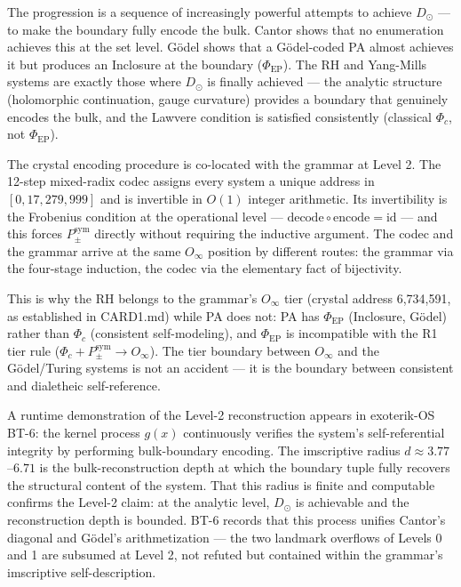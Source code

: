 \documentclass[12pt,a4paper]{article}
\begin{document}
The progression is a sequence of increasingly powerful attempts to achieve $D_{\odot}$ --- to make the boundary fully encode the bulk. Cantor shows that no enumeration achieves this at the set level. G\"odel shows that a G\"odel-coded PA almost achieves it but produces an Inclosure at the boundary ($\Phi_\text{EP}$). The RH and Yang-Mills systems are exactly those where $D_{\odot}$ is finally achieved --- the analytic structure (holomorphic continuation, gauge curvature) provides a boundary that genuinely encodes the bulk, and the Lawvere condition is satisfied consistently (classical $\Phi_c$, not $\Phi_\text{EP}$).

The crystal encoding procedure is co-located with the grammar at Level 2. The 12-step mixed-radix codec assigns every system a unique address in $[0, 17{,}279{,}999]$ and is invertible in $O(1)$ integer arithmetic. Its invertibility is the Frobenius condition at the operational level --- $\text{decode} \circ \text{encode} = \text{id}$ --- and this forces $P_{\pm}^{\text{sym}}$ directly without requiring the inductive argument. The codec and the grammar arrive at the same $O_\infty$ position by different routes: the grammar via the four-stage induction, the codec via the elementary fact of bijectivity.

This is why the RH belongs to the grammar's $O_{\infty}$ tier (crystal address 6,734,591, as established in CARD1.md) while PA does not: PA has $\Phi_\text{EP}$ (Inclosure, G\"odel) rather than $\Phi_c$ (consistent self-modeling), and $\Phi_\text{EP}$ is incompatible with the R1 tier rule ($\Phi_c + P_{\pm}^{\text{sym}} \to O_{\infty}$). The tier boundary between $O_{\infty}$ and the G\"odel/Turing systems is not an accident --- it is the boundary between consistent and dialetheic self-reference.

A runtime demonstration of the Level-2 reconstruction appears in exoterik-OS BT-6: the kernel process $g(x)$ continuously verifies the system's self-referential integrity by performing bulk-boundary encoding. The imscriptive radius $d \approx 3.77$--$6.71$ is the bulk-reconstruction depth at which the boundary tuple fully recovers the structural content of the system. That this radius is finite and computable confirms the Level-2 claim: at the analytic level, $D_\odot$ is achievable and the reconstruction depth is bounded. BT-6 records that this process unifies Cantor's diagonal and G\"odel's arithmetization --- the two landmark overflows of Levels 0 and 1 are subsumed at Level 2, not refuted but contained within the grammar's imscriptive self-description.
\end{document}
